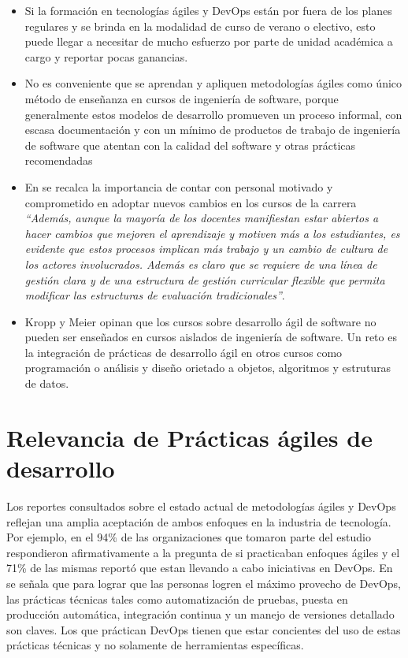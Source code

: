 \documentclass[journal]{IEEEtran}
\begin{document}
\begin{itemize}
        \item Si la formación en tecnologías ágiles y DevOps están por fuera de los planes regulares y se brinda en la modalidad de curso de verano o electivo, esto puede llegar a necesitar de mucho esfuerzo por parte de unidad académica a cargo y reportar pocas ganancias\cite{hickey-salas}.
        \item No es conveniente que se aprendan y apliquen metodologías ágiles como único método de enseñanza en cursos de ingeniería de software, porque generalmente estos modelos de desarrollo promueven un proceso informal, con escasa documentación y con un mínimo de productos de trabajo de ingeniería de software que atentan con la calidad del software y otras prácticas recomendadas\cite{salazar}
        \item En \cite{mora-et-al-1} se recalca la importancia de contar con personal motivado y comprometido en adoptar nuevos cambios en los cursos de la carrera \emph{``Además, aunque la mayoría de los docentes manifiestan estar abiertos a hacer cambios que mejoren el aprendizaje y motiven más a los estudiantes, es evidente que estos procesos implican más trabajo y un cambio de cultura de los actores involucrados. Además es claro que se requiere de una línea de gestión clara y de una estructura de gestión curricular flexible que permita modificar las estructuras de evaluación tradicionales''}.
        \item Kropp y Meier \cite{kropp-meier-1} opinan que los cursos sobre desarrollo ágil de software no pueden ser enseñados en cursos aislados de ingeniería de software. Un reto es la integración de prácticas de desarrollo ágil en otros cursos como programación o análisis y diseño orietado a objetos, algoritmos y estruturas de datos.
\end{itemize}


\section{Relevancia de Prácticas ágiles de desarrollo} \label{sec:relevancia-agile}
Los reportes consultados sobre el estado actual de metodologías ágiles\cite{version-one} y DevOps\cite{puppet-devops} reflejan una amplia aceptación de ambos enfoques en la industria de tecnología. Por ejemplo, en \cite{version-one} el 94\% de las organizaciones que tomaron parte del estudio respondieron afirmativamente a la pregunta de si practicaban enfoques ágiles y el 71\% de las mismas reportó que estan llevando a cabo iniciativas en DevOps. En \cite{puppet-devops} se señala que para lograr que las personas logren el máximo provecho de DevOps, las prácticas técnicas tales como automatización de pruebas, puesta en producción automática, integración continua y un manejo de versiones detallado son claves. Los que práctican DevOps tienen que estar concientes del uso de estas prácticas técnicas y no solamente de herramientas específicas. 
\end{document}
